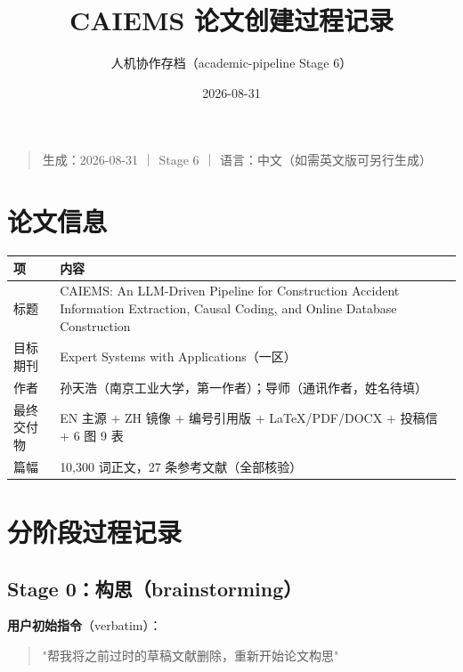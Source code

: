 \documentclass[11pt]{article}
\title{CAIEMS 论文创建过程记录}
\author{人机协作存档（academic-pipeline Stage 6）}
\date{2026-08-31}
\begin{document}
\maketitle

\maketitle
\begin{quote}{\cjkfont 生成：}2026-08-31 {\cjkfont ｜} Stage 6 {\cjkfont ｜} {\cjkfont 语言：中文（如需英文版可另行生成）}\end{quote}

\section{{\cjkfont 论文信息}}
\begin{table}[htbp]
\centering
\small
\begin{tabular}{ll}
\hline
{\cjkfont 项} & {\cjkfont 内容} \\
\hline
{\cjkfont 标题} & CAIEMS: An LLM-Driven Pipeline for Construction Accident Information Extraction, Causal Coding, and Online Database Construction \\
{\cjkfont 目标期刊} & Expert Systems with Applications{\cjkfont （一区）} \\
{\cjkfont 作者} & {\cjkfont 孙天浩（南京工业大学，第一作者）；导师（通讯作者，姓名待填）} \\
{\cjkfont 最终交付物} & EN {\cjkfont 主源} + ZH {\cjkfont 镜像} + {\cjkfont 编号引用版} + LaTeX/PDF/DOCX + {\cjkfont 投稿信} + 6 {\cjkfont 图} 9 {\cjkfont 表} \\
{\cjkfont 篇幅} & 10,300 {\cjkfont 词正文，}27 {\cjkfont 条参考文献（全部核验）} \\
\hline
\end{tabular}
\end{table}
\section{{\cjkfont 分阶段过程记录}}
\subsection{Stage 0{\cjkfont ：构思（}brainstorming{\cjkfont ）}}
\textbf{{\cjkfont 用户初始指令}}{\cjkfont （}verbatim{\cjkfont ）：}

\begin{quote}"{\cjkfont 帮我将之前过时的草稿文献删除，重新开始论文构思}"\end{quote}
\end{document}
